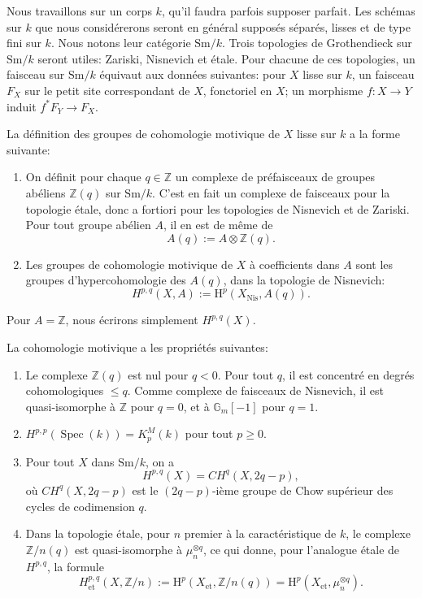 \documentclass[11pt]{article}
\newcommand{\Z}{\mathbb Z}
\newcommand{\Gm}{\mathbb G_m}
\newcommand{\et}{\mathrm{et}}
\newcommand{\Nis}{\mathrm{Nis}}
\newcommand{\Sm}{\mathrm{Sm}}
\newcommand{\Spec}{\operatorname{Spec}}
\theoremstyle{deligne}
\newcommand{\heading}[1]{\vspace{0.7em}\noindent{\bfseries #1}\quad}
\begin{document}
\heading{1.1.} Nous travaillons sur un corps \(k\), qu'il faudra parfois supposer parfait. Les schémas sur \(k\) que nous considérerons seront en général supposés séparés, lisses et de type fini sur \(k\). Nous notons leur catégorie \(\Sm/k\). Trois topologies de Grothendieck sur \(\Sm/k\) seront utiles: Zariski, Nisnevich et étale. Pour chacune de ces topologies, un faisceau sur \(\Sm/k\) équivaut aux données suivantes: pour \(X\) lisse sur \(k\), un faisceau \(F_X\) sur le petit site correspondant de \(X\), fonctoriel en \(X\); un morphisme \(f:X\to Y\) induit \(f^*F_Y\to F_X\).

\heading{1.2.} La définition des groupes de cohomologie motivique de \(X\) lisse sur \(k\) a la forme suivante:
\begin{enumerate}[label=(\alph*)]
\item On définit pour chaque \(q\in\Z\) un complexe de préfaisceaux de groupes abéliens \(\Z(q)\) sur \(\Sm/k\). C'est en fait un complexe de faisceaux pour la topologie étale, donc a fortiori pour les topologies de Nisnevich et de Zariski. Pour tout groupe abélien \(A\), il en est de même de
\[
  A(q):=A\otimes\Z(q).
\]
\item Les groupes de cohomologie motivique de \(X\) à coefficients dans \(A\) sont les groupes d'hypercohomologie des \(A(q)\), dans la topologie de Nisnevich:
\[
  H^{p,q}(X,A):=\mathrm H^p(X_{\Nis},A(q)).
\]
\end{enumerate}
Pour \(A=\Z\), nous écrirons simplement \(H^{p,q}(X)\).

La cohomologie motivique a les propriétés suivantes:
\begin{enumerate}[label=\arabic*.]
\item Le complexe \(\Z(q)\) est nul pour \(q<0\). Pour tout \(q\), il est concentré en degrés cohomologiques \(\le q\). Comme complexe de faisceaux de Nisnevich, il est quasi-isomorphe à \(\Z\) pour \(q=0\), et à \(\Gm[-1]\) pour \(q=1\).
\item \(H^{p,p}(\Spec(k))=K_p^M(k)\) pour tout \(p\ge0\).
\item Pour tout \(X\) dans \(\Sm/k\), on a
\[
  H^{p,q}(X)=CH^q(X,2q-p),
\]
où \(CH^q(X,2q-p)\) est le \((2q-p)\)-ième groupe de Chow supérieur des cycles de codimension \(q\).
\item Dans la topologie étale, pour \(n\) premier à la caractéristique de \(k\), le complexe \(\Z/n(q)\) est quasi-isomorphe à \(\mu_n^{\otimes q}\), ce qui donne, pour l'analogue étale de \(H^{p,q}\), la formule
\[
  H^{p,q}_{\et}(X,\Z/n):=\mathrm H^p(X_{\et},\Z/n(q))
  =\mathrm H^p(X_{\et},\mu_n^{\otimes q}).
\]
\end{enumerate}
\end{document}
